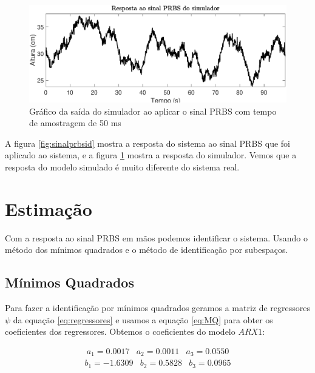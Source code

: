 \begin{figure}[H]
	\centering
	\includegraphics[width=1\linewidth]{sinalprbsidsimul}
	\caption[Gráfico da saída PRBS do simulador]{Gráfico da saída do simulador ao aplicar o sinal PRBS com tempo de amostragem de 50 ms}
	\label{fig:sinalprbsidsimul}
\end{figure}


A figura \ref{fig:sinalprbsid} mostra a resposta do sistema ao sinal PRBS que foi aplicado ao sistema, e a figura \ref{fig:sinalprbsidsimul} mostra a resposta do simulador. Vemos que a resposta do modelo simulado é muito diferente do sistema real.

\section{Estimação}\label{s:4estimacao}

Com a resposta ao sinal PRBS em mãos podemos identificar o sistema. Usando o método dos mínimos quadrados e o método de identificação por subespaços.

\subsection{Mínimos Quadrados}\label{s:4estmq}
Para fazer a identificação por mínimos quadrados geramos a matriz de regressores $\psi$ da equação \eqref{eq:regressores} e usamos a equação \eqref{eq:MQ} para obter os coeficientes dos regressores. Obtemos o coeficientes do modelo $ARX1$:

\begin{equation}
\begin{matrix}
a_1= 0.0017 &
a_2=0.0011&
a_3=0.0550
\end{matrix}
\end{equation}
\begin{equation}
\begin{matrix}
b_1= -1.6309   &
b_2= 0.5828 &
b_3=   0.0965
\end{matrix}
\end{equation}

